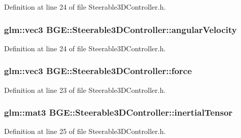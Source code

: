 Definition at line 24 of file Steerable3\-D\-Controller.\-h.

\hypertarget{class_b_g_e_1_1_steerable3_d_controller_ae6729d6b39e2743d8ebd87c8bf4b31af}{
\subsubsection[{angular\-Velocity}]{\setlength{\rightskip}{0pt plus 5cm}glm\-::vec3 B\-G\-E\-::\-Steerable3\-D\-Controller\-::angular\-Velocity}}\label{class_b_g_e_1_1_steerable3_d_controller_ae6729d6b39e2743d8ebd87c8bf4b31af}


Definition at line 24 of file Steerable3\-D\-Controller.\-h.

\hypertarget{class_b_g_e_1_1_steerable3_d_controller_ac74b43bbe6a99800595a4091ed34102d}{
\subsubsection[{force}]{\setlength{\rightskip}{0pt plus 5cm}glm\-::vec3 B\-G\-E\-::\-Steerable3\-D\-Controller\-::force}}\label{class_b_g_e_1_1_steerable3_d_controller_ac74b43bbe6a99800595a4091ed34102d}


Definition at line 23 of file Steerable3\-D\-Controller.\-h.

\hypertarget{class_b_g_e_1_1_steerable3_d_controller_af5559872afa14a177eb5c6f6d1d773b4}{
\subsubsection[{inertial\-Tensor}]{\setlength{\rightskip}{0pt plus 5cm}glm\-::mat3 B\-G\-E\-::\-Steerable3\-D\-Controller\-::inertial\-Tensor}}\label{class_b_g_e_1_1_steerable3_d_controller_af5559872afa14a177eb5c6f6d1d773b4}


Definition at line 25 of file Steerable3\-D\-Controller.\-h.

